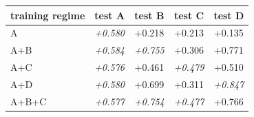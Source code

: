 \begin{tabular}{lcccc}
\toprule
training regime & test A & test B & test C & test D \\
\midrule
A & \emph{+0.580} & +0.218 & +0.213 & +0.135 \\
A+B & \emph{+0.584} & \emph{+0.755} & +0.306 & +0.771 \\
A+C & \emph{+0.576} & +0.461 & \emph{+0.479} & +0.510 \\
A+D & \emph{+0.580} & +0.699 & +0.311 & \emph{+0.847} \\
A+B+C & \emph{+0.577} & \emph{+0.754} & \emph{+0.477} & +0.766 \\
\bottomrule
\end{tabular}